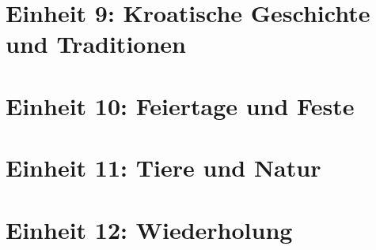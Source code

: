 \section{Einheit 9: Kroatische Geschichte und Traditionen}

\section{Einheit 10: Feiertage und Feste}

\section{Einheit 11: Tiere und Natur}

\section{Einheit 12: Wiederholung}
